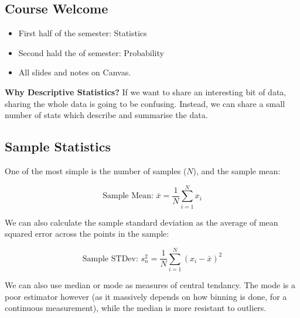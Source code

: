 \graphicspath{{figures/}}

\subsection*{Course Welcome}
\begin{itemize}
    \item First half of the semester: Statistics
    \item Second hald the of semester: Probability
    \item All slides and notes on Canvas.
\end{itemize}

\textbf{Why Descriptive Statistics?}
If we want to share an interesting bit of data, sharing the whole data is going to be confusing. Instead, we can share a small number of stats which describe and summarise the data.

\subsection*{Sample Statistics}
One of the most simple is the number of samples ($N$), and the sample mean:

\[
    \text{Sample Mean: }\bar{x} = \frac{1}{N} \sum^N_{i=1} x_i
\]

We can also calculate the sample standard deviation as the average of mean squared error across the points in the sample:

\[
    \text{Sample STDev: } s_n^2 = \frac{1}{N} \sum_{i=1}^{N} (x_i - \bar{x})^2
\]

We can also use median or mode as measures of central tendancy. The mode is a poor estimator however (as it massively depends on how binning is done, for a continuous measurement), while the median is more resistant to outliers.